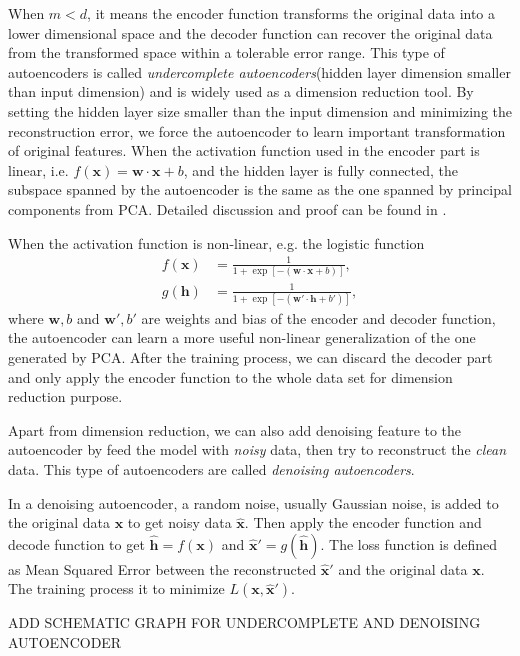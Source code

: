\documentclass[11pt,a4paper]{article}
\theoremstyle{definition}
\numberwithin{equation}{section}
\let\vec\mathbf
\begin{document}
When $m<d$, it means the encoder function transforms the original data into a lower dimensional space and the decoder function can recover the original data from the transformed space within a tolerable error range. This type of autoencoders is called \textit{undercomplete autoencoders}(hidden layer dimension smaller than input dimension) and is widely used as a dimension reduction tool. By setting the hidden layer size smaller than the input dimension and minimizing the reconstruction error, we force the autoencoder to learn important transformation of original features.
When the activation function used in the encoder part is linear, i.e. $f(\vec x) = \vec w\cdot\vec x + b$, and the hidden layer is fully connected, the subspace spanned by the autoencoder is the same as the one spanned by principal components from PCA. Detailed discussion and proof can be found in \cite[Plaut]{Plaut}.

When the activation function is non-linear, e.g. the logistic function
\begin{equation}
\begin{split}
f(\vec x) &= \frac{1}{1+\exp[-(\vec w\cdot\vec x + b)]},\\
g(\vec h) &= \frac{1}{1+\exp[-(\vec w'\cdot\vec h + b')]},
\end{split}
\end{equation}
where $\vec w, b$ and $\vec w', b'$ are weights and bias of the encoder and decoder function, the autoencoder can learn a more useful non-linear generalization of the one generated by PCA. After the training process, we can discard the decoder part and only apply the encoder function to the whole data set for dimension reduction purpose.

Apart from dimension reduction, we can also add denoising feature to the autoencoder by feed the model with \textit{noisy} data, then try to reconstruct the \textit{clean} data. This type of autoencoders are called \textit{denoising autoencoders}. 

In a denoising autoencoder, a random noise, usually Gaussian noise, is added to the original data $\vec x$ to get noisy data $\hat{\vec x}$. Then apply the encoder function and decode function to get $\hat{\vec h} = f(\vec x)$  and $\vec{\hat x'} = g(\hat{\vec h})$. The loss function is defined as Mean Squared Error between the reconstructed $\vec{\hat x'}$ and the original data $\vec x$. The training process it to minimize $L(\vec x,\vec{\hat x'})$. 

ADD SCHEMATIC GRAPH FOR UNDERCOMPLETE AND DENOISING AUTOENCODER
\end{document}

